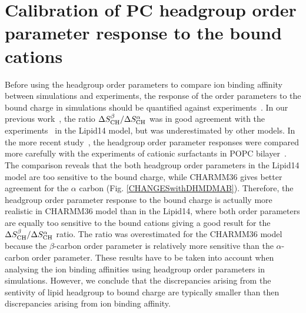\documentclass[journal=jpcbfk]{achemso}
\begin{document}
\pagebreak
\section{Calibration of PC headgroup order parameter response to the bound cations}\label{electrometerCALIBRATION}
Before using the headgroup order parameters to compare ion binding affinity between simulations
and experiments, the response of the order parameters to the bound charge in simulations should be quantified
against experiments~\cite{catte16,melcr18}. In our previous work~\cite{catte16},
the ratio $\Delta S_{\rm CH}^\beta / \Delta S_{\rm CH}^\alpha$ was in good agreement with the experiments~\cite{akutsu81}
in the Lipid14 model, but was underestimated by other models. In the more recent study~\cite{melcr18},
the headgroup order parameter responses were compared more carefully with the experiments of cationic
surfactants in POPC bilayer~\cite{scherer89}. The comparison reveals that the both headgroup
order parameters in the Lipid14 model are too sensitive to the bound charge,
while CHARMM36 gives better agreement for the $\alpha$ carbon (Fig. \ref{CHANGESwithDHMDMAB}).
Therefore, the headgroup order parameter response to the bound charge is actually more realistic
in CHARMM36 model than in the Lipid14, where both order parameters are equally too 
sensitive to the bound cations giving a good result for the $\Delta S_{\rm CH}^\beta / \Delta S_{\rm CH}^\alpha$ ratio.
The ratio was overestimated for the CHARMM36 model because the $\beta$-carbon order parameter
is relatively more sensitive than the $\alpha$-carbon order parameter. These results have to be taken
into account when analysing the ion binding affinities using headgroup order parameters in simulations.
However, we conclude that the discrepancies arising from the sentivity of lipid headgroup to
bound charge are typically smaller than then discrepancies arising from ion binding affinity.
\end{document}
